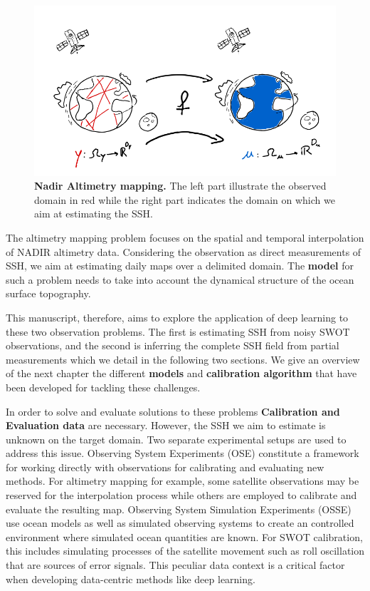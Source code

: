 \begin{bibunit}
\begin{figure}
    \centering
          \includegraphics[width=\linewidth]{Introduction/pics/mapping_task.png}
    \caption{\textbf{Nadir Altimetry mapping.} The left part illustrate the observed domain in red while the right part indicates the domain on which we aim at estimating the SSH.}
    \label{fig:mapping_task}
\end{figure}
The altimetry mapping problem focuses on the spatial and temporal interpolation of NADIR altimetry data. Considering the observation as direct measurements of SSH, we aim at estimating daily maps over a delimited domain. The \textbf{model} for such a problem needs to take into account the dynamical structure of the ocean surface topography.

This manuscript, therefore, aims to explore the application of deep learning to these two observation problems. The first is estimating SSH from noisy SWOT observations, and the second is inferring the complete SSH field from partial measurements which we detail in the following two sections.
We give an overview of the next chapter the different \textbf{models} and \textbf{calibration algorithm} that have been developed for tackling these challenges.
  
In order to solve and evaluate solutions to these problems \textbf{Calibration and Evaluation data} are necessary. However, the SSH we aim to estimate is unknown on the target domain.
Two separate experimental setups are used to address this issue.
Observing System Experiments (OSE) \cite{hamonImpactMultipleAltimeter2019} constitute a framework for working directly with observations for calibrating and evaluating new methods.
For altimetry mapping for example, some satellite observations may be reserved for the interpolation process while others are employed to calibrate and evaluate the resulting map.
Observing System Simulation Experiments (OSSE)\cite{verrierAssessingImpactMultiple2017} use ocean models as well as simulated observing systems to create an controlled environment where simulated ocean quantities are known. For SWOT calibration, this includes simulating processes of the satellite movement such as roll oscillation that are sources of error signals\cite{EmpiricalCrossCalibrationCoherent}.
This peculiar data context is a critical factor when developing data-centric methods like deep learning.


\end{bibunit}
